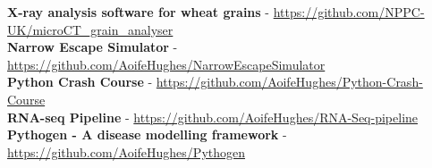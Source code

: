 
\textbf{X-ray analysis software for wheat grains} -
\url{https://github.com/NPPC-UK/microCT_grain_analyser} 
\\ 
\textbf{Narrow Escape Simulator} -
\url{https://github.com/AoifeHughes/NarrowEscapeSimulator}
\\
\textbf{Python Crash Course} -
\url{https://github.com/AoifeHughes/Python-Crash-Course}
\\
\textbf{RNA-seq Pipeline} -
\url{https://github.com/AoifeHughes/RNA-Seq-pipeline}
\\
\textbf{Pythogen - A disease modelling framework} - \url{https://github.com/AoifeHughes/Pythogen}

   